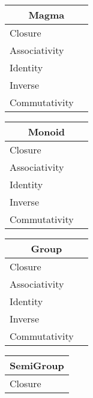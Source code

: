 \documentclass[a4paper,12pt]{scrartcl}    %
\begin{document}
\begin{landscape}
\begin{minipage}[t][]{0.60 \linewidth}
		\begin{minipage}[c]{0,5\textwidth}	
			\begin{tabular}{|l|p{2cm}|} %
			  \hline
			  \multicolumn{2}{c}{\cellcolor{yellow!25}Magma} \\
			  \hline
			   \cellcolor{blue!25} Closure&  \\
			    \cellcolor{red!25} Associativity&  \\
			    \cellcolor{red!25} Identity&  \\
			    \cellcolor{red!25} Inverse&  \\
			    \cellcolor{red!25} Commutativity&  \\
			  \hline
			\end{tabular}
			\vfill
			\begin{tabular}{|l|p{2cm}|} %
			  \hline
			  \multicolumn{2}{c}{\cellcolor{yellow!25}Monoid} \\
			  \hline
			   \cellcolor{blue!25} Closure&  \\
			    \cellcolor{blue!25} Associativity&  \\
			    \cellcolor{blue!25} Identity&  \\
			    \cellcolor{red!25} Inverse&  \\
			    \cellcolor{red!25} Commutativity&  \\
			  \hline
			\end{tabular}
			\vfill
			\begin{tabular}{|l|p{2cm}|} %
			  \hline
			  \multicolumn{2}{c}{\cellcolor{yellow!25}Group} \\
			  \hline
			   \cellcolor{blue!25} Closure&  \\
			    \cellcolor{blue!25} Associativity&  \\
			    \cellcolor{blue!25} Identity&  \\
			    \cellcolor{blue!25} Inverse&  \\
			    \cellcolor{red!25} Commutativity&  \\
			  \hline
			\end{tabular}
		\end{minipage}
		\hspace{1cm}
		\begin{minipage}[c]{0,5\textwidth}	
\begin{tabular}{|l|p{2cm}|} %
			  \hline
			  \multicolumn{2}{c}{\cellcolor{yellow!25}SemiGroup} \\
			  \hline
			   \cellcolor{blue!25} Closure&  \\

\end{tabular}
\end{minipage}
\end{minipage}
\end{landscape}
\end{document}
